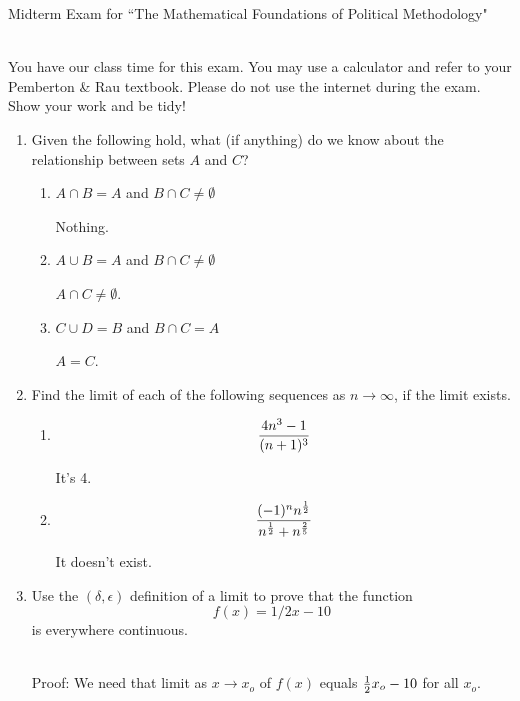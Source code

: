 \documentclass[11pt]{article}
\begin{document}
\noindent \large Midterm Exam for ``The Mathematical Foundations of Political Methodology"

\normalsize
\ \\You have our class time for this exam.  You may use a calculator and refer to your Pemberton \& Rau textbook.  Please do not use the internet during the exam.  Show your work and be tidy!

\begin{enumerate}

\item Given the following hold, what (if anything) do we know about the relationship between sets $A$ and $C$?

\begin{enumerate}
\item $A\cap B= A$ and $B\cap C\not=\emptyset$

 Nothing.
 
\item $A\cup B= A$ and $B\cap C\not=\emptyset$

$A\cap C\not=\emptyset$.

\item $C \cup D=B$ and $B\cap C=A$

 $A = C$.

\end{enumerate}

\vspace{.2in}

\item Find the limit of each of the following sequences as $n\rightarrow \infty$, if the limit exists.
\begin{enumerate}
\item $${{4n^3-1}\over{(n+1)^3}}$$

It's 4.

 
\item $${{(-1)^n n^{1\over 2}}\over{n^{1\over 2}+n^{2\over 5}}}$$

 It doesn't exist.
 
\end{enumerate}

\vspace{.2in}

\item Use the $(\delta, \epsilon)$ definition of a limit to prove that the function $$f(x)={1/2}x-10$$ is everywhere continuous.

\ \\Proof: We need that limit as $x\rightarrow x_o$ of $f(x)$ equals ${1\over 2}x_o-10$ for all $x_o$.  


\end{enumerate}
\end{document}
